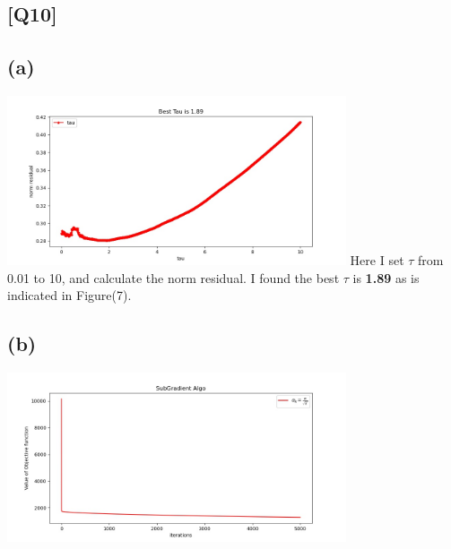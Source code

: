 \documentclass[12pt, a4 paper]{article}
\begin{document}
    \begin{framed}
        \section{[Q10]}
        \subsection{(a)}
        {\centering
        \includegraphics[width=10cm, height=5cm]{Q10_1.jpg}
        }
        \indent Here I set $\tau$ from 0.01 to 10, and calculate the norm residual.
        I found the best $\tau$ is \textbf{1.89} as is indicated in Figure(7).

        \subsection{(b)}
        {\centering
        \includegraphics[width=10cm, height=5cm]{Q10_2_1.jpg}
        }
        

\end{framed}
\end{document}
